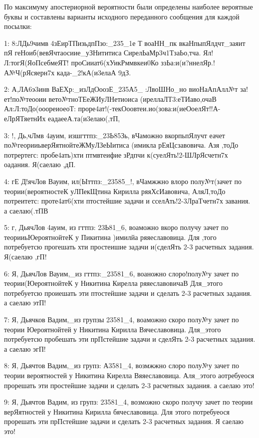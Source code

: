 По максимуму апостериорной вероятности были определены наиболее вероятные буквы и составлены варианты исходного переданного сообщения для каждой посылки:

\vspace{0.5cm}

{ \scriptsize
1: 8:ЛДь9чимв 4зЕирТПизьдпПзо:\_235\_1е Т воаНН\_пк вкаНпыпЯлдчт\_заяит пЯ геНоиб(вевЯчтаосиие\_уЗНититиса СирелЬаМр3ч1ТзаЬо,тча. Ял!Л:тогЯ(ЯоПсебмеЯТ! проСииат6(хУикРммвкеи0Ко ззЬа:и(и?ннелЯр.!А№Ч(рЯсяерн7х када-\_2!кА(и3елаА 9дЗ.

2: А,ЛА6э3инв ВаЕХр:\_изЛдОоозЕ\_235А5\_ :ЛвоШНо\_но виоНаАпАлл№т за!ет!по№теооии вето№тноТЕеЖИуЛНетиоиса (иреллаЛТ3:еТИаво,очаВ Ал:Л:тоДо(ооореиоеоТ: проре4ат!(-текОоовтеи.ио(зова:и(иеОоелЯт!!А-еЛрЯТяетнИх еадаееА.та(и3елаю(,тП,

3: !, Дь,чЛмв 4ауим, изшгттпз:\_23Ь85Зь, вЧаможно вкорпьпЯлучт еачет по№георииьверЯятнойтеЖМуЛЗеЫитиса (имикла рЕяЦсзавовича. Азя ,тоДо потрертегс: пробе4ать)хти птмвтеифие зРдпчи к(суелЯть!2-ШЛрЯсчетн7х оадания. Я(саелаю ,дП.

4: гЕ Д!ячЛов Вауим, ил(Ыттпз:\_23585\_!, вЧамжжно влоро полу№т(зачет по теории(вероятностеК уЛПекЩтина Кирилла ряяХсИавовича, АляЛ,тоДо потреитетс: проте4ат6(хти птостейшие задачи и сселАть!2-3ЛраТчетн7х завания. а саелаю(.тПВ

5: г, ДьячЛов 4ауим, из гттпз: 23Ь81\_6, воаможно вкоро получу зачет по теорииьЮероятнойтеК у Пикитина )имилйа ряяеславовица. Для ,того потребуетсю прогешать хти простеишие задачи и(сделЯть 2-3 расчетных задания. Я(саелаю ,гП!

6: Я, ДьячЛов Вауим,\_из гттпз:\_23581\_6, воаножно слоро!полу№у зачет по теории(ЮероятнойтеК у Никитина Кирелла ряяеславовичаВ Для\_этого потребуетсю проиешать эти птостейшие задачи и сделать 2-3 расчетных задания. а саелаю этП!

7: Я, Дьячков Вадим,\_из групзы 23581\_4, воаможно скоро полу№у зачет по теории Юероятнойтей у Никитина Кирилла Вячеславовица. Для\_этого потребуетсю пробешать эти прПстейшие задачи и сделЯть 2-3 расчетных задания. а саелаю эгП!

8: Я, Дьячтов Вадим,\_из групз: А3581\_4, возмжжно слоро полу№у зачет по теории вероятностей у Никитина Кирелла Вяяеславовица. Аля\_этого аотребуеося прорешать эти простейшие задачи и сделать 2-3 расчетных задания. а саелаю это!

9: Я, Дьячтов Вадим, из групз: 23581\_4, возможно скоро получу зачет по теории верЯятностей у Никитина Кирилла бячеславовица. Для этого потребуеося прорешать эти прПстейшие задачи и сделать 2-3 расчетных задания. Я саелаю это!

}
